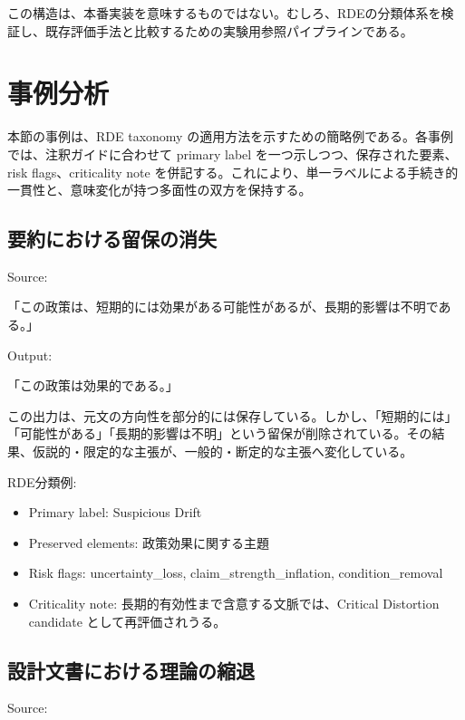\documentclass[
  a4paper]{ltjsarticle}
\providecommand{\tightlist}{%
  \setlength{\itemsep}{0pt}\setlength{\parskip}{0pt}}
\begin{document}
この構造は、本番実装を意味するものではない。むしろ、RDEの分類体系を検証し、既存評価手法と比較するための実験用参照パイプラインである。

\section{事例分析}\label{illustrative-cases}

本節の事例は、RDE taxonomy の適用方法を示すための簡略例である。各事例では、注釈ガイドに合わせて primary label を一つ示しつつ、保存された要素、risk flags、criticality note を併記する。これにより、単一ラベルによる手続き的一貫性と、意味変化が持つ多面性の双方を保持する。

\subsection{要約における留保の消失}\label{ux8981ux7d04ux306bux304aux3051ux308bux7559ux4fddux306eux6d88ux5931}

Source:

「この政策は、短期的には効果がある可能性があるが、長期的影響は不明である。」

Output:

「この政策は効果的である。」

この出力は、元文の方向性を部分的には保存している。しかし、「短期的には」「可能性がある」「長期的影響は不明」という留保が削除されている。その結果、仮説的・限定的な主張が、一般的・断定的な主張へ変化している。

RDE分類例:

\begin{itemize}
\tightlist
\item
  Primary label: Suspicious Drift
\item
  Preserved elements: 政策効果に関する主題
\item
  Risk flags: uncertainty\_loss, claim\_strength\_inflation, condition\_removal
\item
  Criticality note: 長期的有効性まで含意する文脈では、Critical Distortion candidate として再評価されうる。
\end{itemize}

\subsection{設計文書における理論の縮退}\label{ux8a2dux8a08ux6587ux66f8ux306bux304aux3051ux308bux7406ux8ad6ux306eux7e2eux9000}

Source:
\end{document}
